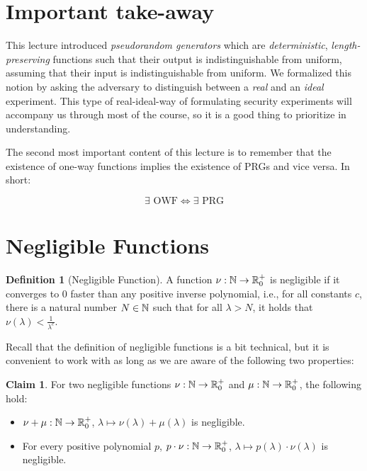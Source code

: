 \documentclass[a4paper,table,dvipsnames]{article}
\theoremstyle{definition}
\newtheorem{definition}{Definition}[section]
\newtheorem{claim}{Claim}
\begin{document}
\section{Important take-away}
This lecture introduced \emph{pseudorandom generators} which are \emph{deterministic},
\emph{length-preserving} functions such that their output is indistinguishable from uniform,
assuming that their input is indistinguishable from uniform. We formalized this notion by
asking the adversary to distinguish between a \emph{real} and an \emph{ideal} experiment.
This type of real-ideal-way of formulating security experiments will accompany us through
most of the course, so it is a good thing to prioritize in understanding.

The second most important content of this lecture is to remember that the existence of
one-way functions implies the existence of PRGs and vice versa. In short:

\[\exists\text{ OWF} \Leftrightarrow\exists\text{ PRG}\]

\appendix
\section{Negligible Functions}\label{app:negligible}
\begin{definition}[Negligible Function]
A function $\nu:\mathbb{N}\rightarrow\mathbb{R}_0^+$ is negligible if it converges to $0$ faster than any positive inverse polynomial, i.e., for all constants $c$, there is a natural number $N\in\mathbb{N}$ such that for all $\lambda>N$, it holds that $\nu(\lambda)<\frac{1}{\lambda^c}$.
\end{definition}
Recall that the definition of negligible functions is a bit technical, but it is convenient to work with as long as we are aware of the following two properties:
\begin{claim}
For two negligible functions $\nu:\mathbb{N}\rightarrow\mathbb{R}_0^+$ and $\mu:\mathbb{N}\rightarrow\mathbb{R}_0^+$, the following hold:
\begin{itemize}
\item $\nu+\mu:\mathbb{N}\rightarrow\mathbb{R}_0^+$, $\lambda\mapsto\nu(\lambda)+\mu(\lambda)$ is negligible.
\item For every positive polynomial $p$, $p\cdot\nu:\mathbb{N}\rightarrow\mathbb{R}_0^+$, $\lambda\mapsto p(\lambda)\cdot\nu(\lambda)$ is negligible.
\end{itemize}
\end{claim}
\fi
\end{document}
